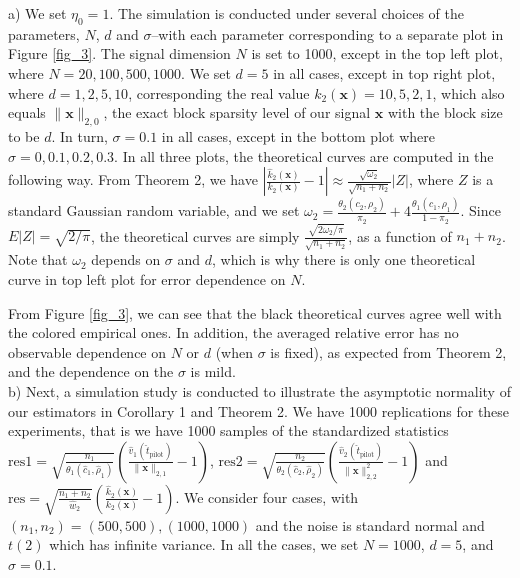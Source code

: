 \documentclass[journal,onecolumn]{IEEEtran}
\begin{document}
a) We set $\eta_0=1$. The simulation is conducted under several choices of the parameters, $N$, $d$ and $\sigma$--with each parameter corresponding to a separate plot in Figure \ref{fig_3}. The signal dimension $N$ is set to 1000, except in the top left plot, where $N=20,100,500,1000$. We set $d=5$ in all cases, except in top right plot, where $d=1,2,5,10$, corresponding the real value $k_2(\mathbf{x})=10,5,2,1$, which also equals $\lVert\mathbf{x}\rVert_{2,0}$, the exact block sparsity level of our signal $\mathbf{x}$ with the block size to be $d$. In turn, $\sigma=0.1$ in all cases, except in the bottom plot where $\sigma=0,0.1,0.2,0.3$. In all three plots, the theoretical curves are computed in the following way. From Theorem 2, we have $|\frac{\hat{k}_2(\mathbf{x})}{k_2(\mathbf{x})}-1|\approx \frac{\sqrt{\omega_2}}{\sqrt{n_1+n_2}}|Z|$, where $Z$ is a standard Gaussian random variable, and we set $\omega_2=\frac{\theta_2(c_2,\rho_2)}{\pi_2}+4\frac{\theta_1(c_1,\rho_1)}{1-\pi_2}$. Since $E|Z|=\sqrt{2/\pi}$, the theoretical curves are simply $\frac{\sqrt{2\omega_2/\pi}}{\sqrt{n_1+n_2}}$, as a function of $n_1+n_2$. Note that $\omega_2$ depends on $\sigma$ and $d$, which is why there is only one theoretical curve in top left plot for error dependence on $N$.

From Figure \ref{fig_3}, we can see that the black theoretical curves agree well with the colored empirical ones. In addition, the averaged relative error has no observable dependence on $N$ or $d$ (when $\sigma$ is fixed), as expected from Theorem 2, and the dependence on the $\sigma$ is mild. \\

b) Next, a simulation study is conducted to illustrate the asymptotic normality of our estimators in Corollary 1 and Theorem 2. We have 1000 replications for these experiments, that is we have 1000 samples of the standardized statistics $\mathrm{res1}=\sqrt{\frac{n_1}{\theta_1(\hat{c}_1,\hat{\rho}_1)}}\left(\frac{\hat{v}_{1}(\hat{t}_{\mathrm{pilot}})}{\lVert\mathbf{x}\rVert_{2,1}}-1\right)$, $\mathrm{res2}=\sqrt{\frac{n_2}{\theta_2(\hat{c}_2,\hat{\rho}_2)}}\left(\frac{\hat{v}_{2}(\hat{t}_{\mathrm{pilot}})}{\lVert\mathbf{x}\rVert_{2,2}^{2}}-1\right)$ and $\mathrm{res}=\sqrt{\frac{n_1+n_2}{\hat{w}_2}}\left(\frac{\hat{k}_2(\mathbf{x})}{k_{2}(\mathbf{x})}-1\right)$. We consider four cases, with $(n_1,n_2)=(500,500), (1000,1000)$ and the noise is standard normal and $t(2)$ which has infinite variance. In all the cases, we set $N=1000$, $d=5$, and $\sigma=0.1$.
\end{document}
